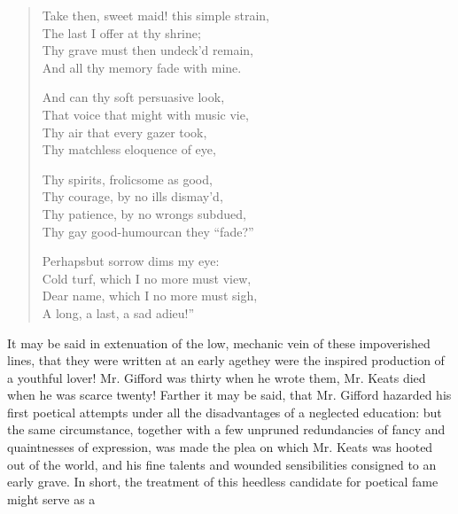 \begin{verse}
  \begin{altverse}
    Take then, sweet maid! this simple strain, \\
    The last I offer at thy shrine; \\
    Thy grave must then undeck'd remain, \\
    And all thy memory fade with mine.
  \end{altverse}

  \begin{altverse}
    And can thy soft persuasive look, \\
    That voice that might with music vie, \\
    Thy air that every gazer took, \\
    Thy matchless eloquence of eye,
  \end{altverse}

  \begin{altverse}
    Thy spirits, frolicsome as good, \\
    Thy courage, by no ills dismay'd, \\
    Thy patience, by no wrongs subdued, \\
    Thy gay good-humour\textemdash can they ``fade?''
  \end{altverse}

  \begin{altverse}
    Perhaps\textemdash but sorrow dims my eye: \\
    Cold turf, which I no more must view, \\
    Dear name, which I no more must sigh, \\
    A long, a last, a sad adieu!''
  \end{altverse}
\end{verse}
It may be said in extenuation of the low, mechanic vein of these
impoverished lines, that they were written at an early
age\textemdash they were the inspired production of a youthful
lover! Mr. Gifford was thirty when he wrote them, Mr. Keats died
when he was scarce twenty! Farther it may be said, that
Mr. Gifford hazarded his first poetical attempts under all the
disadvantages of a neglected education: but the same circumstance,
together with a few unpruned redundancies of fancy and
quaintnesses of expression, was made the plea on which Mr. Keats
was hooted out of the world, and his fine talents and wounded
sensibilities consigned to an early grave. In short, the treatment
of this heedless candidate for poetical fame might serve as a
